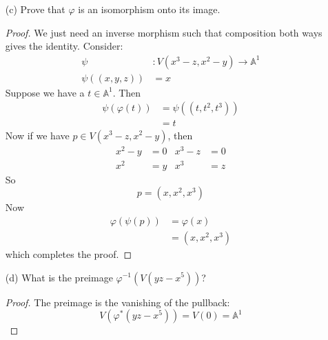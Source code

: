 \documentclass{article}
\begin{document}
\begin{itemize}
        \item [(c)] Prove that $\varphi$ is an isomorphism onto its image.
            \begin{proof}
                We just need an inverse morphism such that composition both ways gives the identity. Consider:
                    \begin{align*}
                        \psi            &: V(x^{3} - z, x^{2} - y) \rightarrow \mathbb{A}^{1} \\
                        \psi((x, y, z)) &= x                                      
                    \end{align*}
                Suppose we have a $t \in \mathbb{A}^{1}$. Then
                    \begin{align*}
                        \psi(\varphi(t)) &= \psi((t, t^{2}, t^{3})) \\
                                         &= t                         
                    \end{align*}
                Now if we have $p \in V(x^{3} - z, x^{2} - y)$, then 
                    \begin{align*}
                        x^{2} - y &= 0 & x^{3} - z &= 0 \\
                        x^{2}     &= y & x^{3}     &= z   
                    \end{align*}
                So 
                    \begin{equation*}
                        p = (x, x^{2}, x^{3})
                    \end{equation*}
                Now
                    \begin{align*}
                        \varphi(\psi(p)) &= \varphi(x)        \\
                                         &= (x, x^{2}, x^{3})   
                    \end{align*}
                which completes the proof.
            \end{proof}

        \item [(d)] What is the preimage $\varphi^{-1}(V(yz - x^{5}))$? 
            \begin{proof}
                The preimage is the vanishing of the pullback:
                    \begin{equation*}
                        V(\varphi^{*}(yz - x^{5})) = V(0) = \mathbb{A}^{1}
                    \end{equation*}
            \end{proof}
    \end{itemize}
\end{document}
